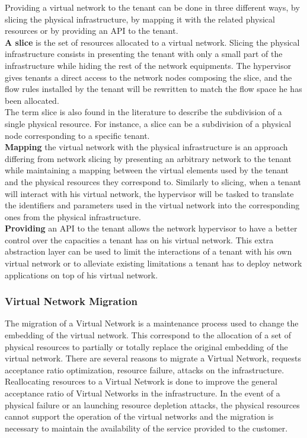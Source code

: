Providing a virtual network to the tenant can be done in three different ways, by slicing the physical infrastructure, by mapping it with the related physical resources or by providing an API to the tenant.\\
\textbf{A slice} is the set of resources allocated to a virtual network.
Slicing the physical infrastructure consists in presenting the tenant with only a small part of the infrastructure while hiding the rest of the network equipments.
The hypervisor gives tenants a direct access to the network nodes composing the slice, and the flow rules installed by the tenant will be rewritten to match the flow space he has been allocated.\\
The term slice is also found in the literature to describe the subdivision of a single physical resource. For instance, a slice can be a subdivision of a physical node corresponding to a specific tenant.\\
\textbf{Mapping} the virtual network with the physical infrastructure is an approach differing from network slicing by presenting an arbitrary network to the tenant while maintaining a mapping between the virtual elements used by the tenant and the physical resources they correspond to.
Similarly to slicing, when a tenant will interact with his virtual network, the hypervisor will be tasked to translate the identifiers and parameters used in the virtual network into the corresponding ones from the physical infrastructure.\\
\textbf{Providing} an API to the tenant allows the network hypervisor to have a better control over the capacities a tenant has on his virtual network. This extra abstraction layer can be used to limit the interactions of a tenant with his own virtual network or to alleviate existing limitations a tenant has to deploy network applications on top of his virtual network. 


\subsubsection{Virtual Network Migration}
The migration of a Virtual Network is a maintenance process used to change the embedding of the virtual network. 
This correspond to the allocation of a set of physical resources to partially or totally replace the original embedding of the virtual network.
There are several reasons to migrate a Virtual Network, requests acceptance ratio optimization, resource failure, attacks on the infrastructure.
Reallocating resources to a Virtual Network is done to improve the general acceptance ratio of Virtual Networks in the infrastructure.
In the event of a physical failure or an launching resource depletion attacks, the physical resources cannot support the operation of the virtual networks and the migration is necessary to maintain the availability of the service provided to the customer.

